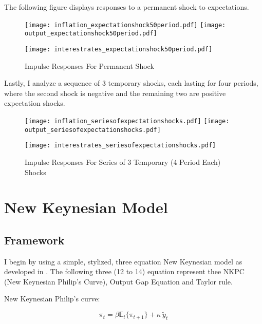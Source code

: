 \documentclass[12pt]{article}
\newcommand{\1}{\mathbbm 1}
\begin{document}
	
The following figure displays responses to a permanent shock to expectations.
	
	\begin{figure}[H]
		\texttt{[image: inflation\_expectationshock50period.pdf]}
		\hfill
		\texttt{[image: output\_expectationshock50period.pdf]}
		\hfill
		\begin{Center}
			\texttt{[image: interestrates\_expectationshock50period.pdf]}
		\end{Center}
		\caption{Impulse Responses For Permanent Shock}
	\end{figure}


Lastly, I analyze a sequence of 3 temporary shocks, each lasting for four periods, where the second shock is negative and the remaining two are positive expectation shocks.


	\begin{figure}[H]
	\texttt{[image: inflation\_seriesofexpectationshocks.pdf]}
	\hfill
	\texttt{[image: output\_seriesofexpectationshocks.pdf]}
	\hfill
	\begin{Center}
		\texttt{[image: interestrates\_seriesofexpectationshocks.pdf]}
	\end{Center}
	\caption{Impulse Responses For Series of 3 Temporary (4 Period Each) Shocks}
\end{figure}
		
		
		\newpage
		
		
			
		
		\section{New Keynesian Model}
		
		\subsection{Framework}
		
		I begin by using a simple, stylized, three equation New Keynesian model as developed in \cite{gali2015book}. The following three (12 to 14) equation represent thee NKPC (New Keynesian Philip's Curve), Output Gap Equation and Taylor rule.
		
	New Keynesian Philip's curve: 
	
	\begin{equation}
		\pi_{t} = \beta \mathbb{E}_{t}\{\pi_{t+1}\} + \kappa \: \widetilde{y}_{t}
	\end{equation}
\end{document}
